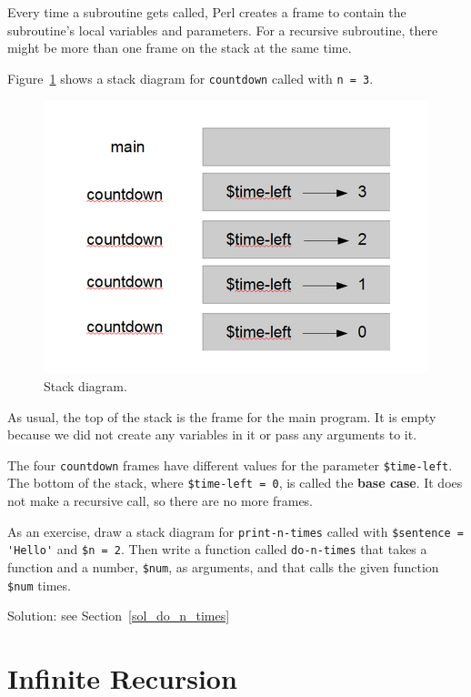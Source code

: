 Every time a subroutine gets called, Perl creates a
frame to contain the subroutine's local variables and parameters.
For a recursive subroutine, there might be more than one frame 
on the stack at the same time.

Figure~\ref{fig.stack2} shows a stack diagram for {\tt countdown} called with
{\tt n = 3}.

\begin{figure}
\centerline
{\includegraphics[scale=0.6]{figs/stack2.png}}
\caption{Stack diagram.}
\label{fig.stack2}
\end{figure}


As usual, the top of the stack is the frame for the main 
program.
It is empty because we did not create any variables in 
it or pass any arguments to it.

The four {\tt countdown} frames have different values for the
parameter {\tt \$time-left}.  The bottom of the stack, where {\tt \$time-left = 0}, is
called the {\bf base case}.  It does not make a recursive call, so
there are no more frames.

As an exercise, draw a stack diagram for \verb"print-n-times" 
called with
\verb"$sentence = 'Hello'" and {\tt \$n = 2}.
Then write a function called \verb"do-n-times" that takes a function
and a number, {\tt \$num}, as arguments, and that calls
the given function {\tt \$num} times.
\label{do_n_times}

Solution: see Section~\ref{sol_do_n_times}


\section{Infinite Recursion}


